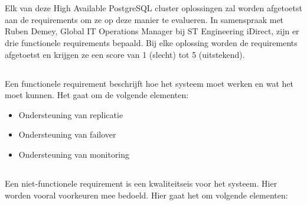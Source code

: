 \section{}
\label{sec:Requirementsanalyse}

Elk van deze High Available PostgreSQL cluster oplossingen zal worden afgetoetst aan de requirements om ze op deze manier te evalueren. In samenspraak met Ruben Demey, Global IT Operations Manager bij ST Engineering iDirect, zijn er drie functionele requirements bepaald. Bij elke oplossing worden de requirements afgetoetst en krijgen ze een score van 1 (slecht) tot 5 (uitstekend).


\subsection{}
\label{subsec:Functionele Requirements}
Een functionele requirement beschrijft hoe het systeem moet werken en wat het moet kunnen. Het gaat om de volgende elementen:

\begin{itemize}
    \item Ondersteuning van replicatie
    \item Ondersteuning van failover
    \item Ondersteuning van monitoring
\end{itemize}


\subsection{}
\label{subsec:Niet-functionele Requirements}
Een niet-functionele requirement is een kwaliteitseis voor het systeem. Hier worden vooral voorkeuren mee bedoeld. Hier gaat het om volgende elementen:

